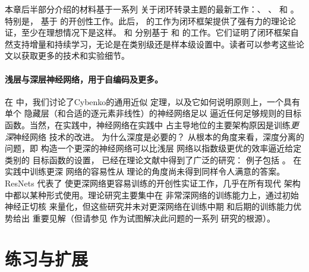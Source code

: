 \documentclass[../../book-main_zh.tex]{subfiles}
\begin{document}
本章后半部分介绍的材料基于一系列
关于闭环转录主题的最新工作：\cite{Dai-entropy-2022}、
\cite{pai2022pursuit}、\cite{tong2023incremental} 和 \cite{pmlr-v234-tong24a}。特别是， 基于 \cite{Dai-entropy-2022} 的开创性工作。此后，\cite{pai2022pursuit} 的工作为闭环框架提供了强有力的理论论证，至少在理想情况下是这样。 和  分别基于 \cite{tong2023incremental} 和 \cite{pmlr-v234-tong24a} 的工作。它们证明了闭环框架自然支持增量和持续学习，无论是在类别级还是样本级设置中。读者可以参考这些论文以获取更多的技术和实验细节。


\paragraph{浅层与深层神经网络，用于自编码及更多。}
在  中，我们讨论了Cybenko的通用近似
定理，以及它如何说明原则上，一个具有单个
隐藏层（和合适的逐元素非线性）的神经网络足以
逼近任何足够规则的目标函数。当然，在实践中，神经网络在实践中
占主导地位的主要架构原因是训练\textit{更深}神经网络
技术的改进。
为什么深度是必要的？
从根本的角度来看，深度分离的问题，即
构造一个更深的神经网络可以比浅层
网络以指数级更优的效率逼近给定类别的
目标函数的设置，
已经在理论文献中得到了广泛的研究：
例子包括 \cite{Telgarsky2016-sn,Bresler2020-xy,Venturi2021-qc}。
在实践中训练更深
网络的容易性从
理论的角度尚未得到同样令人满意的答案。
ResNets \cite{he2016deep} 代表了
使更深网络更容易训练的开创性实证工作，几乎在所有现代
架构中都以某种形式使用。理论研究主要集中在
非常深网络的训练能力上，通过初始神经正切核
\cite{Buchanan2021-sj,Martens2021-cx} 来量化，但这些研究并未对更深网络在训练中期
和后期的训练能力优势给出
重要见解（但请参见 \cite{Yang2021-gw} 作为试图解决此问题的一系列
研究的根源）。

\section{练习与扩展}
\end{document}
